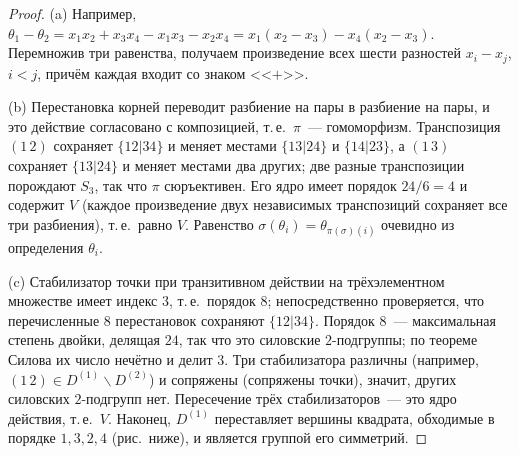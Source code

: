\begin{proof}
(a) Например, $\theta_1-\theta_2=x_1x_2+x_3x_4-x_1x_3-x_2x_4=x_1(x_2-x_3)-x_4(x_2-x_3)$. Перемножив три равенства, получаем
произведение всех шести разностей $x_i-x_j$, $i<j$, причём каждая входит со знаком <<$+$>>.

(b) Перестановка корней переводит разбиение на пары в разбиение на пары, и это действие согласовано с композицией,
т.\,е.\ $\pi$~--- гомоморфизм. Транспозиция $(1\,2)$ сохраняет $\{12|34\}$ и меняет местами $\{13|24\}$ и $\{14|23\}$, а $(1\,3)$
сохраняет $\{13|24\}$ и меняет местами два других; две разные транспозиции порождают $S_3$, так что $\pi$ сюръективен.
Его ядро имеет порядок $24/6=4$ и содержит $V$ (каждое произведение двух независимых транспозиций сохраняет все три
разбиения), т.\,е.\ равно $V$. Равенство $\sigma(\theta_i)=\theta_{\pi(\sigma)(i)}$ очевидно из определения $\theta_i$.

(c) Стабилизатор точки при транзитивном действии на трёхэлементном множестве имеет индекс $3$, т.\,е.\ порядок $8$;
непосредственно проверяется, что перечисленные $8$ перестановок сохраняют $\{12|34\}$. Порядок $8$~--- максимальная степень
двойки, делящая $24$, так что это силовские $2$-подгруппы; по теореме Силова их число нечётно и делит $3$. Три
стабилизатора различны (например, $(1\,2)\in D^{(1)}\smallsetminus D^{(2)}$) и сопряжены (сопряжены точки), значит, других силовских
$2$-подгрупп нет. Пересечение трёх стабилизаторов~--- это ядро действия, т.\,е.\ $V$. Наконец, $D^{(1)}$ переставляет вершины
квадрата, обходимые в порядке $1,3,2,4$ (рис.~ниже), и является группой его симметрий.
\end{proof}

